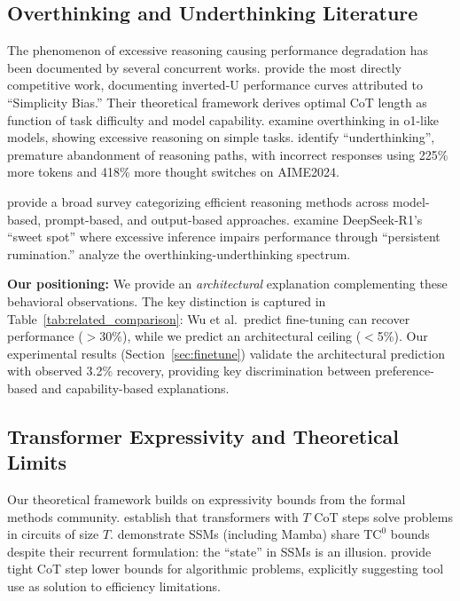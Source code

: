 \documentclass{article}
\theoremstyle{plain}
\theoremstyle{definition}
\theoremstyle{remark}
\begin{document}
\subsection{Overthinking and Underthinking Literature}

The phenomenon of excessive reasoning causing performance degradation has been documented by several concurrent works. \citet{wu2025more} provide the most directly competitive work, documenting inverted-U performance curves attributed to ``Simplicity Bias.'' Their theoretical framework derives optimal CoT length as function of task difficulty and model capability. \citet{chen2025do} examine overthinking in o1-like models, showing excessive reasoning on simple tasks. \citet{wang2026thoughts} identify ``underthinking'', premature abandonment of reasoning paths, with incorrect responses using 225\% more tokens and 418\% more thought switches on AIME2024.

\citet{sui2025stop} provide a broad survey categorizing efficient reasoning methods across model-based, prompt-based, and output-based approaches. \citet{marjanovic2025thoughtology} examine DeepSeek-R1's ``sweet spot'' where excessive inference impairs performance through ``persistent rumination.'' \citet{su2025between} analyze the overthinking-underthinking spectrum.

\textbf{Our positioning:} We provide an \emph{architectural} explanation complementing these behavioral observations. The key distinction is captured in Table~\ref{tab:related_comparison}: Wu et al.\ predict fine-tuning can recover performance ($>$30\%), while we predict an architectural ceiling ($<$5\%). Our experimental results (Section~\ref{sec:finetune}) validate the architectural prediction with observed 3.2\% recovery, providing key discrimination between preference-based and capability-based explanations.

\subsection{Transformer Expressivity and Theoretical Limits}

Our theoretical framework builds on expressivity bounds from the formal methods community. \citet{merrill2024expressive} establish that transformers with $T$ CoT steps solve problems in circuits of size $T$. \citet{merrill2024illusion} demonstrate SSMs (including Mamba) share $\text{TC}^0$ bounds despite their recurrent formulation: the ``state'' in SSMs is an illusion. \citet{bavandpour2025lower} provide tight CoT step lower bounds for algorithmic problems, explicitly suggesting tool use as solution to efficiency limitations.
\end{document}
